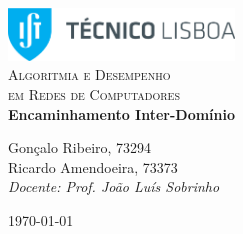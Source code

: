 \begin{titlepage}

	\begin{center}

		\includegraphics[width=6cm]{./logoIST}\\[2.5cm]

		\textsc{\LARGE Algoritmia e Desempenho\\[5mm]
		em Redes de Computadores}\\[2cm]

		{ \huge \bfseries Encaminhamento Inter-Domínio \\[2.5cm] }


		\noindent
		\begin{center} \Large
			Gonçalo Ribeiro, 73294\\[5mm]

			Ricardo Amendoeira, 73373\\[4.5cm]

			\textit{Docente: Prof. João Luís Sobrinho}

		\end{center}

		\vfill

		{\large \today}


	\end{center}

\end{titlepage}